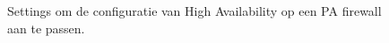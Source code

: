 \begin{figure}[H]
    \centering
    \caption[PA High Availability settings]{\label{fig:grail}Settings om de configuratie van High Availability op een PA firewall aan te passen.}
\end{figure}





